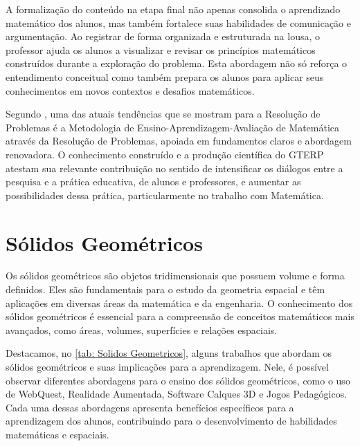 A formalização do conteúdo na etapa final não apenas consolida o aprendizado matemático dos alunos, mas também fortalece suas habilidades de comunicação e argumentação. Ao registrar de forma organizada e estruturada na lousa, o professor ajuda os alunos a visualizar e revisar os princípios matemáticos construídos durante a exploração do problema. Esta abordagem não só reforça o entendimento conceitual como também prepara os alunos para aplicar seus conhecimentos em novos contextos e desafios matemáticos.


Segundo , uma das atuais tendências que se mostram para a Resolução de Problemas é a  Metodologia de Ensino-Aprendizagem-Avaliação de Matemática através da Resolução de Problemas, apoiada em fundamentos claros e abordagem renovadora. O conhecimento construído e a produção científica do GTERP atestam sua relevante contribuição no sentido de intensificar os diálogos entre a pesquisa e a prática educativa, de alunos e professores, e aumentar as possibilidades dessa prática, particularmente no trabalho com Matemática.

\section{Sólidos Geométricos} \label{sec:2.5_Solidos Geometricos}


Os sólidos geométricos são objetos tridimensionais que possuem volume e forma definidos. Eles são fundamentais para o estudo da geometria espacial e têm aplicações em diversas áreas da matemática e da engenharia. O conhecimento dos sólidos geométricos é essencial para a compreensão de conceitos matemáticos mais avançados, como áreas, volumes, superfícies e relações espaciais.

Destacamos, no \autoref{tab: Solidos Geometricos}, alguns trabalhos que abordam os sólidos geométricos e suas implicações para a aprendizagem. Nele, é possível observar diferentes abordagens para o ensino dos sólidos geométricos, como o uso de WebQuest, Realidade Aumentada, Software Calques 3D e Jogos Pedagógicos. Cada uma dessas abordagens apresenta benefícios específicos para a aprendizagem dos alunos, contribuindo para o desenvolvimento de habilidades matemáticas e espaciais.


